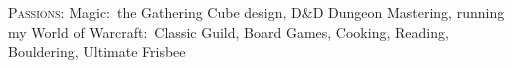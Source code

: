 \documentclass[letterpaper,10pt]{article} %
\begin{document}
\textsc{Passions:} Magic:\ the Gathering Cube design, D\&D Dungeon Mastering, running my World of Warcraft:\ Classic Guild, Board Games, Cooking, Reading, Bouldering, Ultimate Frisbee







\end{document}
